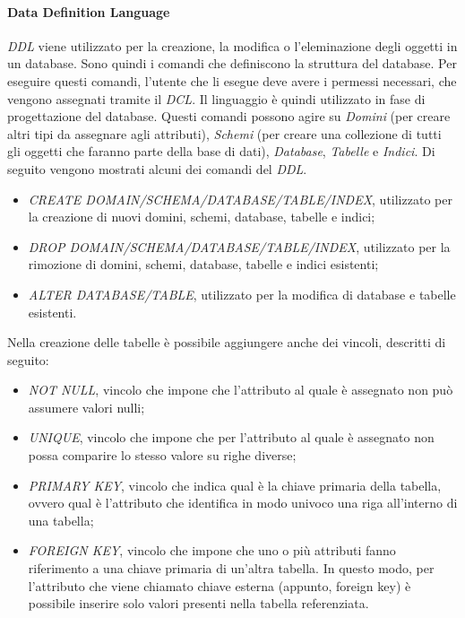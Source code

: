   \paragraph{Data Definition Language}
  \textit{DDL} viene utilizzato per la creazione, la modifica o l'eleminazione degli oggetti in un database. Sono quindi i
  comandi che definiscono la struttura del database. Per eseguire questi comandi, l'utente che li esegue deve avere i permessi
  necessari, che vengono assegnati tramite il \textit{DCL}. Il linguaggio è quindi utilizzato in fase di progettazione del database.
  Questi comandi possono agire su \textit{Domini} (per creare altri tipi da assegnare agli attributi), \textit{Schemi}
  (per creare una collezione di tutti gli oggetti che faranno parte della base di dati), \textit{Database}, \textit{Tabelle}
  e \textit{Indici}. Di seguito vengono mostrati alcuni dei comandi del \textit{DDL}.
  \begin{itemize}
    \item \textit{CREATE DOMAIN/SCHEMA/DATABASE/TABLE/INDEX}, utilizzato per la creazione di nuovi domini, schemi, database,
    tabelle e indici;
    \item \textit{DROP DOMAIN/SCHEMA/DATABASE/TABLE/INDEX}, utilizzato per la rimozione di domini, schemi, database,
    tabelle e indici esistenti;
    \item \textit{ALTER DATABASE/TABLE}, utilizzato per la modifica di database e tabelle esistenti.
  \end{itemize}
  Nella creazione delle tabelle è possibile aggiungere anche dei vincoli, descritti di seguito:
  \begin{itemize}
    \item \textit{NOT NULL}, vincolo che impone che l'attributo al quale è assegnato non può assumere valori nulli;
    \item \textit{UNIQUE}, vincolo che impone che per l'attributo al quale è assegnato non possa comparire lo stesso
    valore su righe diverse;
    \item \textit{PRIMARY KEY}, vincolo che indica qual è la chiave primaria della tabella, ovvero qual è l'attributo
    che identifica in modo univoco una riga all'interno di una tabella;
    \item \textit{FOREIGN KEY}, vincolo che impone che uno o più attributi fanno riferimento a una chiave primaria di
    un'altra tabella. In questo modo, per l'attributo che viene chiamato chiave esterna (appunto, foreign key) è possibile
    inserire solo valori presenti nella tabella referenziata.
  \end{itemize}
  
